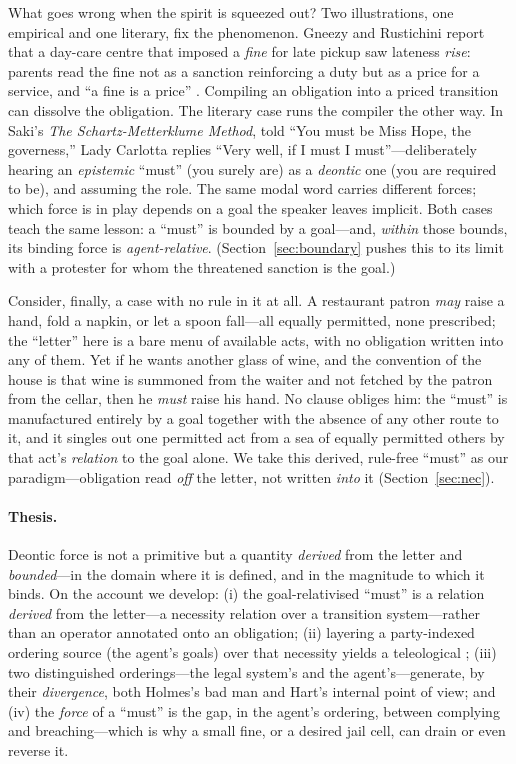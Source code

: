 What goes wrong when the spirit is squeezed out? Two illustrations, one empirical and one
literary, fix the phenomenon. Gneezy and Rustichini report that a day-care centre that
imposed a \emph{fine} for late pickup saw lateness \emph{rise}: parents read the fine not
as a sanction reinforcing a duty but as a price for a service, and ``a fine is a price''
. Compiling an obligation into a priced transition can
dissolve the obligation. The literary case runs the compiler the other way. In Saki's
\emph{The Schartz-Metterklume Method}, told ``You must be Miss Hope, the governess,'' Lady
Carlotta replies ``Very well, if I must I must''---deliberately hearing an \emph{epistemic}
``must'' (you surely are) as a \emph{deontic} one (you are required to be), and assuming
the role. The same modal word carries different forces; which force is in play depends on
a goal the speaker leaves implicit. Both cases teach the same lesson: a ``must'' is bounded
by a goal---and, \emph{within} those bounds, its binding force is \emph{agent-relative}.
(Section~\ref{sec:boundary} pushes this to its limit with a protester for whom the
threatened sanction is the goal.)

Consider, finally, a case with no rule in it at all. A restaurant patron \emph{may} raise a
hand, fold a napkin, or let a spoon fall---all equally permitted, none prescribed; the
``letter'' here is a bare menu of available acts, with no obligation written into any of
them. Yet if he wants another glass of wine, and the convention of the house is that wine is
summoned from the waiter and not fetched by the patron from the cellar, then he \emph{must}
raise his hand. No clause obliges him: the ``must'' is manufactured entirely by a goal
together with the absence of any other route to it, and it singles out one permitted act
from a sea of equally permitted others by that act's \emph{relation} to the goal alone. We
take this derived, rule-free ``must'' as our paradigm---obligation read \emph{off} the
letter, not written \emph{into} it (Section~\ref{sec:nec}).

\paragraph{Thesis.} Deontic force is not a primitive but a quantity \emph{derived} from the
letter and \emph{bounded}---in the domain where it is defined, and in the magnitude to which
it binds. On the account we develop: (i) the goal-relativised
``must'' is a relation \emph{derived} from the letter---a necessity relation over a
transition system---rather than an operator annotated onto an obligation; (ii) layering a
party-indexed ordering source (the agent's goals) over that necessity yields a
teleological \MUST{}; (iii) two distinguished orderings---the legal system's and the
agent's---generate, by their \emph{divergence}, both Holmes's bad man and Hart's internal
point of view; and (iv) the \emph{force} of a ``must'' is the gap, in the agent's
ordering, between complying and breaching---which is why a small fine, or a desired jail
cell, can drain or even reverse it.

